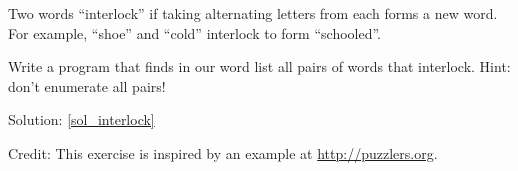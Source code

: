 \begin{exercise}
\label{interlock}

Two words ``interlock'' if taking alternating letters from 
each forms a new word.  For example, ``shoe'' and ``cold''
interlock to form ``schooled''.

Write a program that finds in our word list all pairs of 
words that interlock. Hint: don't enumerate all pairs!

Solution: \ref{sol_interlock}

Credit: This exercise is inspired by an example at \url{http://puzzlers.org}.

\end{exercise}


